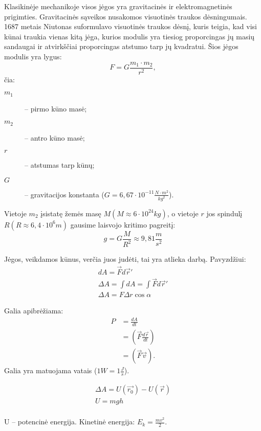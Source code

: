 Klasikinėje mechanikoje visos jėgos yra gravitacinės ir elektromagnetinės
prigimties. Gravitacinės sąveikos nusakomos visuotinės traukos
dėsningumais. 1687 metais Niutonas suformulavo visuotinės traukos
dėsnį, kuris teigia, kad visi kūnai traukia vienas kitą jėga, kurios
modulis yra tiesiog proporcingas jų masių sandaugai ir atvirkščiai
proporcingas atstumo tarp jų kvadratui. Šios jėgos modulis yra
lygus:
\begin{equation*}
  F = G \frac{m_{1}\cdot m_{2}}{r^{2}},
\end{equation*}
čia:
\begin{description}
  \item[$m_{1}$] – pirmo kūno masė;
  \item[$m_{2}$] – antro kūno masė;
  \item[$r$] – atstumas tarp kūnų;
  \item[$G$] – gravitacijos konstanta
    ($G = 6,67 \cdot 10^{-11}\frac{N\cdot m^{2}}{kg^{2}}$).
\end{description}
Vietoje $m_{2}$ įsistatę žemės masę
$M (M \approx 6 \cdot 10^{24} kg)$, o vietoje $r$ jos spindulį
$R (R \approx 6,4 \cdot 10^{6} m)$ gausime laisvojo kritimo
pagreitį:
\begin{equation*}
  g = G\frac{M}{R^{2}} \approx 9,81 \frac{m}{s^{2}}
\end{equation*}

Jėgos, veikdamos kūnus, verčia juos judėti, tai yra atlieka darbą.
Pavyzdžiui:
\begin{align*}
  dA = \vec{F}d\vec{r}'\\
  \Delta A = \int dA = \int \vec{F}d\vec{r}' \\
  \Delta A= F \Delta r \cos \alpha
\end{align*}

Galia apibrėžiama:
\begin{align*}
  P
  &= \frac{dA}{dt} \\
  &= \left( \vec{F}\frac{d\vec{r}}{dt} \right) \\
  &= \left( \vec{F}\vec{v} \right).
\end{align*}
Galia yra matuojama vatais ($1 W = 1 \frac{J}{s}$).

\begin{align*}
  \Delta A = U(\vec{r_{0}}) - U(\vec{r}) \\
  U = mgh \\
\end{align*}

U – potencinė energija. Kinetinė energija: $E_{k} = \frac{mv^{2}}{2}$.

